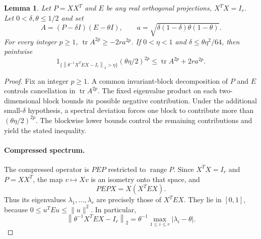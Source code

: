 \documentclass[11pt]{article}
\newtheorem{lemma}[theorem]{Lemma}
\theoremstyle{definition}
\theoremstyle{remark}
\theoremstyle{plain}
\DeclareMathOperator{\tr}{tr}
\newcommand{\norm}[1]{\left\lVert#1\right\rVert_2}
\begin{document}
\begin{lemma}\label{lem:transfer}
Let \(P=XX^T\) and \(E\) be any real orthogonal projections,
\(X^TX=I_r\). Let \(0<\delta,\theta\le1/2\) and set
\[
 A=(P-\delta I)(E-\theta I),\qquad
 a=\sqrt{\delta(1-\delta)\theta(1-\theta)}.
\]
For every integer \(p\ge1\), \(\tr A^{2p}\ge-2r a^{2p}\).
If \(0<\eta<1\) and \(\delta\le\theta\eta^2/64\), then pointwise
\begin{equation}\label{eq:spectral-transfer}
 1_{\{\norm{\theta^{-1}X^TEX-I_r}>\eta\}}
          (\theta\eta/2)^{2p}
                \le\tr A^{2p}+2r a^{2p}.
\end{equation}
\end{lemma}
\begin{proof}
Fix an integer \(p\ge1\). A common invariant-block
decomposition of \(P\) and \(E\) controls cancellation in
\(\tr A^{2p}\). The fixed eigenvalue product on each
two-dimensional block bounds its possible negative contribution.
Under the additional small-\(\delta\) hypothesis, a spectral
deviation forces one block to contribute more than
\((\theta\eta/2)^{2p}\). The blockwise lower bounds control the
remaining contributions and yield the stated inequality.

\paragraph{Compressed spectrum.}
The compressed operator is \(PEP\) restricted to
\(\operatorname{range}P\). Since \(X^TX=I_r\) and \(P=XX^T\),
the map \(v\mapsto Xv\) is an isometry onto that space, and
\[
 PEPX=X(X^TEX).
\]
Thus its eigenvalues \(\lambda_1,\ldots,\lambda_r\) are precisely
those of \(X^TEX\). They lie in \([0,1]\), because
\(0\le u^TEu\le\|u\|^2\). In particular,
\[
 \norm{\theta^{-1}X^TEX-I_r}
       =\theta^{-1}\max_{1\le i\le r}|\lambda_i-\theta|.
\]


\end{proof}
\end{document}
